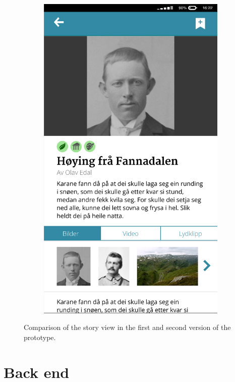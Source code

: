 \begin{figure}
\begin{subfigure}[h]{0.4\textwidth}
		\includegraphics[width=\textwidth]{fig/prototype2}
	\end{subfigure}
	\caption{Comparison of the story view in the first and second version of the prototype.}
	\label{Fig:prototype}
\end{figure}

\section{Back end}

